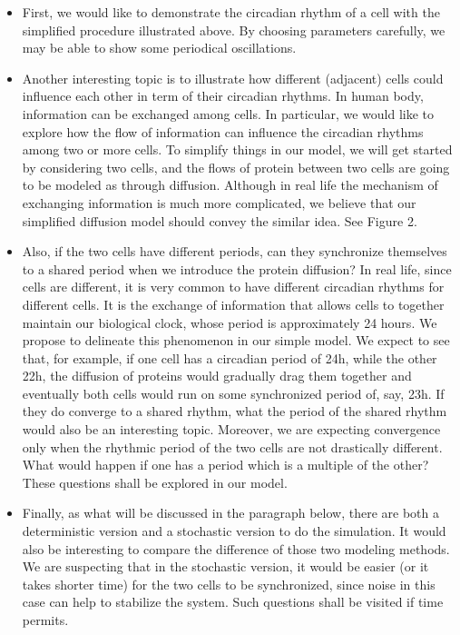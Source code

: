 \documentclass[12pt]{article}
\renewcommand{\(}{\left (}
\renewcommand{\)}{\right )}
\begin{document}
\begin{itemize}
    \item First, we would like to demonstrate the circadian rhythm of a cell with the simplified procedure illustrated above. By choosing parameters carefully, we may be able to show some periodical oscillations.
    \item Another interesting topic is to illustrate how different (adjacent) cells could influence each other in term of their circadian rhythms. In human body, information can be exchanged among cells. In particular, we would like to explore how the flow of information can influence the circadian rhythms among two or more cells. To simplify things in our model, we will get started by considering two cells, and the flows of protein between two cells are going to be modeled as through diffusion. Although in real life the mechanism of exchanging information is much more complicated, we believe that our simplified diffusion model should convey the similar idea. See Figure 2.
    \item Also, if the two cells have different periods, can they synchronize themselves to a shared period when we introduce the protein diffusion? In real life, since cells are different, it is very common to have different circadian rhythms for different cells. It is the exchange of information that allows cells to together maintain our biological clock, whose period is approximately 24 hours. We propose to delineate this phenomenon in our simple model. We expect to see that, for example, if one cell has a circadian period of 24h, while the other 22h, the diffusion of proteins would gradually drag them together and eventually both cells would run on some synchronized period of, say, 23h. If they do converge to a shared rhythm, what the period of the shared rhythm would also be an interesting topic. Moreover, we are expecting convergence only when the rhythmic period of the two cells are not drastically different. What would happen if one has a period which is a multiple of the other? These questions shall be explored in our model.
    \item Finally, as what will be discussed in the paragraph below, there are both a deterministic version and a stochastic version to do the simulation. It would also be interesting to compare the difference of those two modeling methods. We are suspecting that in the stochastic version, it would be easier (or it takes shorter time) for the two cells to be synchronized, since noise in this case can help to stabilize the system. Such questions shall be visited if time permits.
\end{itemize}
\end{document}
